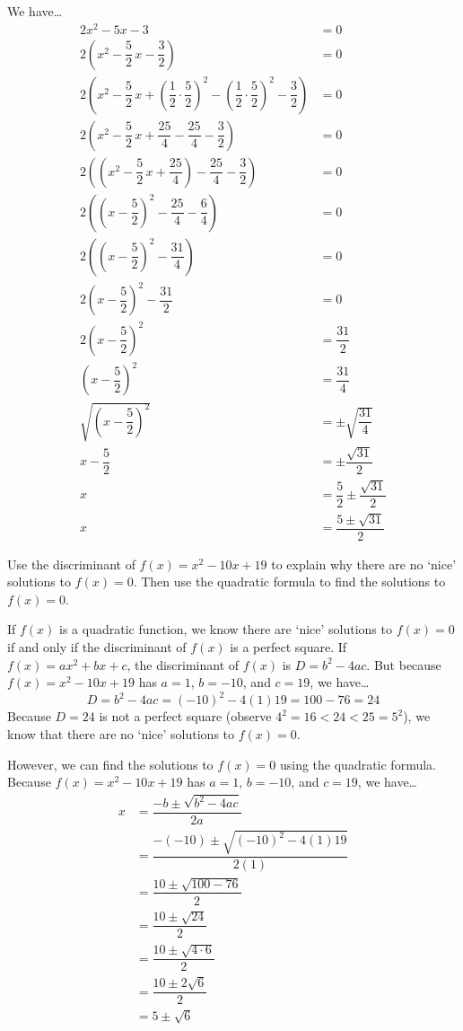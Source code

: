 \documentclass[11pt,letterpaper]{article}
\begin{document}
\sol We have\dots
	\[
	\begin{aligned}
	2x^2 - 5x - 3&= 0 \\
	2 \left( x^2 - \dfrac{5}{2}\,x - \dfrac{3}{2} \right)&= 0 \\
	2 \left( x^2 - \dfrac{5}{2}\,x + \left(\dfrac{1}{2} \cdot \dfrac{5}{2} \right)^2 - \left(\dfrac{1}{2} \cdot \dfrac{5}{2} \right)^2 - \dfrac{3}{2} \right)&= 0 \\
	2 \left( x^2 - \dfrac{5}{2}\,x + \dfrac{25}{4} - \dfrac{25}{4} - \dfrac{3}{2} \right)&= 0 \\
	2 \left( \left(x^2 - \dfrac{5}{2}\,x + \dfrac{25}{4} \right) - \dfrac{25}{4} - \dfrac{3}{2} \right)&= 0 \\
	2 \left( \left(x - \dfrac{5}{2} \right)^2 - \dfrac{25}{4} - \dfrac{6}{4} \right)&= 0 \\
	2 \left( \left(x - \dfrac{5}{2} \right)^2 - \dfrac{31}{4} \right)&= 0 \\
	2 \left(x - \dfrac{5}{2} \right)^2 - \dfrac{31}{2}&= 0 \\
	2 \left( x - \dfrac{5}{2} \right)^2&= \dfrac{31}{2} \\
	\left(x - \dfrac{5}{2} \right)^2&= \dfrac{31}{4} \\
	\sqrt{\left(x - \dfrac{5}{2} \right)^2}&= \pm \sqrt{\dfrac{31}{4}} \\
	x - \dfrac{5}{2}&= \pm \dfrac{\sqrt{31}}{2} \\
	x&= \dfrac{5}{2} \pm \dfrac{\sqrt{31}}{2} \\
	x&= \dfrac{5 \pm \sqrt{31}}{2}
	\end{aligned}
	\]



\newpage



 Use the discriminant of $f(x)= x^2 - 10x + 19$ to explain why there are no `nice' solutions to $f(x)= 0$. Then use the quadratic formula to find the solutions to $f(x)= 0$. \pspace

\sol If $f(x)$ is a quadratic function, we know there are `nice' solutions to $f(x)= 0$ if and only if the discriminant of $f(x)$ is a perfect square. If $f(x)= ax^2 + bx + c$, the discriminant of $f(x)$ is $D= b^2 - 4ac$. But because $f(x)= x^2 - 10x + 19$ has $a= 1$, $b= -10$, and $c= 19$, we have\dots
	\[
	D= b^2 - 4ac= (-10)^2 - 4(1)19= 100 - 76= 24
	\]
Because $D= 24$ is not a perfect square (observe $4^2= 16 < 24 < 25= 5^2$), we know that there are no `nice' solutions to $f(x)= 0$. \pspace

However, we can find the solutions to $f(x)= 0$ using the quadratic formula. Because $f(x)= x^2 - 10x + 19$ has $a= 1$, $b= -10$, and $c= 19$, we have\dots
	\[
	\begin{aligned}
	x&= \dfrac{-b \pm \sqrt{b^2 - 4ac}}{2a} \\
	&= \dfrac{-(-10) \pm \sqrt{(-10)^2 - 4(1)19}}{2(1)} \\
	&= \dfrac{10 \pm \sqrt{100 - 76}}{2} \\
	&= \dfrac{10 \pm \sqrt{24}}{2} \\
	&= \dfrac{10 \pm \sqrt{4 \cdot 6}}{2} \\
	&= \dfrac{10 \pm 2 \sqrt{6}}{2} \\
	&= 5 \pm \sqrt{6}
	\end{aligned}
	\]
\end{document}
